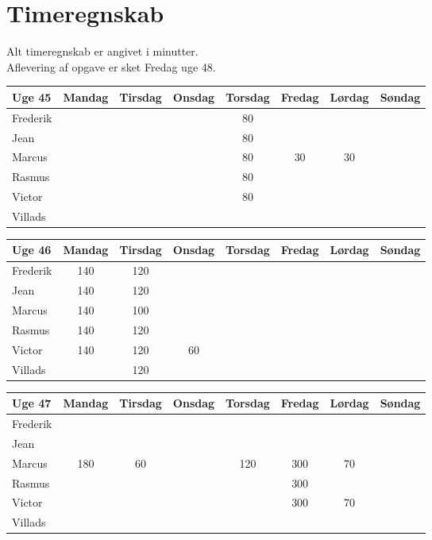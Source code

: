 \section*{Timeregnskab}

Alt timeregnskab er angivet i minutter.\\
Aflevering af opgave er sket Fredag uge 48.
\begin{table}[H]
\centering
\begin{tabular}{@{}lccccccc@{}} %
\toprule
Uge 45   & Mandag & Tirsdag & Onsdag & Torsdag & Fredag & Lørdag & Søndag \\ \midrule
Frederik &    &    &    &  80  &    &    &    \\
Jean     &    &    &    &  80  &    &    &    \\
Marcus   &    &    &    &  80  &  30  &  30  &    \\
Rasmus   &    &    &    &  80  &    &    &    \\
Victor   &    &    &    &  80  &    &    &    \\
Villads  &    &    &    &      &    &    &    \\ 
\end{tabular}

\begin{tabular}{@{}lccccccc@{}}
\toprule
Uge 46   & Mandag & Tirsdag & Onsdag & Torsdag & Fredag & Lørdag & Søndag \\ \midrule
Frederik &  140  &  120  &    &    &    &    &    \\
Jean     &  140  &  120  &    &    &    &    &    \\
Marcus   &  140  &  100  &    &    &    &    &    \\
Rasmus   &  140  &  120  &    &    &    &    &    \\
Victor   &  140  &  120  &  60  &    &    &    &    \\
Villads  &    &   120 &    &    &    &    &    \\ 
\end{tabular}

\begin{tabular}{@{}lccccccc@{}}
\toprule
Uge 47   & Mandag & Tirsdag & Onsdag & Torsdag & Fredag & Lørdag & Søndag \\ \midrule
Frederik &    &    &    &    &    &    &    \\
Jean     &    &    &    &    &    &    &    \\
Marcus   &  180  &  60  &    &  120  &  300  &  70  &    \\
Rasmus   &    &    &    &    &  300  &    &    \\
Victor   &    &    &    &    &  300  &  70  &    \\
Villads  &    &    &    &    &    &    &    \\ 
\end{tabular}


\end{table}
